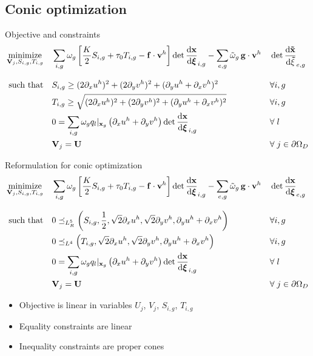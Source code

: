 \documentclass{beamer}  %
\newcommand{\xx}{\mathbf{x}}
\newcommand{\vv}{\mathbf{v}}
\DeclareMathOperator*{\minimize}{minimize}
\begin{document}
\subsection{Conic optimization}
\begin{frame}{Objective and constraints}
    \small
    \begin{alignat*}{2}
        \minimize_{\mathbf{V}_j, S_{i,g}, T_{i,g}} \quad &\sum_{i,g} \omega_g \left[\frac{K}{2} S_{i,g} + \tau_0 T_{i,g} - \mathbf{f} \cdot \vv^h \right] \det \dv{\mathbf{x}}{\boldsymbol \xi}_{i,g} - \sum_{e,g} \tilde \omega_g \,\mathbf{g}\cdot \vv^h &&\det \dv{\mathbf{\tilde x}}{\boldsymbol \tilde \xi}_{e,g}\\[8pt]
        \text{such that} \quad & S_{i,g} \geq (2\partial_x{u^h})^2 + (2\partial_y{v^h})^2 + (\partial_y{u^h}+\partial_x{v^h})^2 && \forall i, g\\
        &T_{i,g} \geq \sqrt{(2\partial_x{u^h})^2 + (2\partial_y{v^h})^2 + (\partial_y{u^h}+\partial_x{v^h})^2} && \forall i, g\\
        &0 = \sum_{i,g} \omega_g q_l \vert_{\xx_g} \left(\partial_x u^h + \partial_y v^h\right) \det \dv{\mathbf{x}}{\boldsymbol \xi}_{i,g} && \forall\; l\\
        &\mathbf{V}_{j} = \mathbf{U} && \forall\; j \in \partial\Omega_D
    \end{alignat*}
    \normalsize
\end{frame}

\begin{frame}{Reformulation for conic optimization}
    \small
    \begin{alignat*}{2}
        \minimize_{\mathbf{V}_j, S_{i,g}, T_{i,g}} \quad &\sum_{i,g} \omega_g \left[\frac{K}{2} S_{i,g} + \tau_0 T_{i,g} - \mathbf{f} \cdot \vv^h \right] \det \dv{\mathbf{x}}{\boldsymbol \xi}_{i,g}-\sum_{e,g} \tilde \omega_g \,\mathbf{g}\cdot \vv^h &&\det \dv{\mathbf{x}}{\boldsymbol \xi}_{e,g}\\[8pt]
        \text{such that} \quad & 0 \preceq_{L^5_R} \left(S_{i,g}, \frac{1}{2}, \sqrt{2}\partial_x u^h, \sqrt{2}\partial_y v^h, \partial_y u^h+\partial_x v^h\right) && \forall i, g\\
        & 0 \preceq_{L^4} \left(T_{i,g}, \sqrt{2}\partial_x u^h, \sqrt{2}\partial_y v^h, \partial_y u^h+\partial_x v^h\right) && \forall i, g\\
        &0 = \sum_{i,g} \omega_g q_l \vert_{\xx_g} \left(\partial_x u^h + \partial_y v^h\right) \det \dv{\mathbf{x}}{\boldsymbol \xi}_{i,g} && \forall\; l\\
        &\mathbf{V}_{j} = \mathbf{U} && \forall\; j \in \partial\Omega_D
    \end{alignat*}
    \normalsize
    \pause
    \vspace{-12pt}
    \begin{itemize}
        \item Objective is linear in variables $U_j$, $V_j$, $S_{i,g}$, $T_{i,g}$
        \item Equality constraints are linear
        \item Inequality constraints are proper cones
    \end{itemize}
\end{frame}
\end{document}

